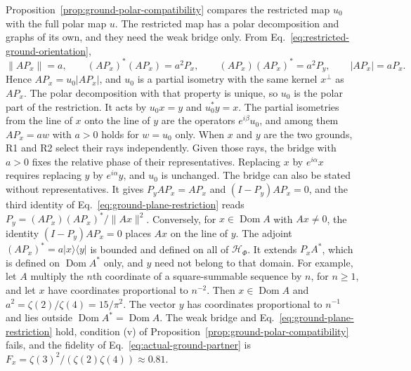 \documentclass[11pt]{article}
\theoremstyle{definition}
\newcommand{\ket}[1]{\lvert #1\rangle}
\newcommand{\bra}[1]{\langle #1\rvert}
\begin{document}
Proposition~\ref{prop:ground-polar-compatibility} compares the restricted map $u_0$ with the full polar map $u$. The restricted map has a polar decomposition and graphs of its own, and they need the weak bridge only. From Eq.~\eqref{eq:restricted-ground-orientation},
\begin{equation}
 \|AP_x\|=a,\qquad (AP_x)^*(AP_x)=a^2P_x,\qquad (AP_x)(AP_x)^*=a^2P_y,\qquad |AP_x|=aP_x .
 \label{eq:ground-plane-restriction}
\end{equation}
Hence $AP_x=u_0|AP_x|$, and $u_0$ is a partial isometry with the same kernel $x^\perp$ as $AP_x$. The polar decomposition with that property is unique, so $u_0$ is the polar part of the restriction. It acts by $u_0x=y$ and $u_0^*y=x$. The partial isometries from the line of $x$ onto the line of $y$ are the operators $e^{i\beta}u_0$, and among them $AP_x=aw$ with $a>0$ holds for $w=u_0$ only. When $x$ and $y$ are the two grounds, R1 and R2 select their rays independently. Given those rays, the bridge with $a>0$ fixes the relative phase of their representatives. Replacing $x$ by $e^{i\alpha}x$ requires replacing $y$ by $e^{i\alpha}y$, and $u_0$ is unchanged. The bridge can also be stated without representatives. It gives $P_yAP_x=AP_x$ and $(I-P_y)AP_x=0$, and the third identity of Eq.~\eqref{eq:ground-plane-restriction} reads $P_y=(AP_x)(AP_x)^*/\|Ax\|^2$. Conversely, for $x\in\operatorname{Dom}A$ with $Ax\ne0$, the identity $(I-P_y)AP_x=0$ places $Ax$ on the line of $y$. The adjoint $(AP_x)^*=a\ket{x}\!\bra{y}$ is bounded and defined on all of $\mathcal H_\Phi$. It extends $P_xA^*$, which is defined on $\operatorname{Dom}A^*$ only, and $y$ need not belong to that domain. For example, let $A$ multiply the $n$th coordinate of a square-summable sequence by $n$, for $n\geq1$, and let $x$ have coordinates proportional to $n^{-2}$. Then $x\in\operatorname{Dom}A$ and $a^2=\zeta(2)/\zeta(4)=15/\pi^2$. The vector $y$ has coordinates proportional to $n^{-1}$ and lies outside $\operatorname{Dom}A^*=\operatorname{Dom}A$. The weak bridge and Eq.~\eqref{eq:ground-plane-restriction} hold, condition (v) of Proposition~\ref{prop:ground-polar-compatibility} fails, and the fidelity of Eq.~\eqref{eq:actual-ground-partner} is $F_x=\zeta(3)^2/(\zeta(2)\zeta(4))\approx0.81$.
\end{document}
